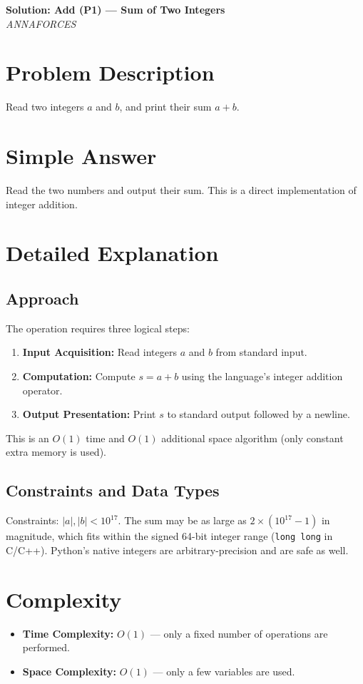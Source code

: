 \documentclass[11pt,a4paper]{article}
\begin{document}
\begin{center}
  {\LARGE \bf Solution: Add (P1) — Sum of Two Integers}\\[6pt]
  {\large \it ANNAFORCES}\
  \vspace{6pt}
\end{center}

\section*{Problem Description}
Read two integers $a$ and $b$, and print their sum $a+b$.

\section*{Simple Answer}
Read the two numbers and output their sum. This is a direct implementation of integer addition.

\section*{Detailed Explanation}
\subsection*{Approach}
The operation requires three logical steps:
\begin{enumerate}[leftmargin=*]
  \item \textbf{Input Acquisition:} Read integers $a$ and $b$ from standard input.
  \item \textbf{Computation:} Compute $s = a + b$ using the language's integer addition operator.
  \item \textbf{Output Presentation:} Print $s$ to standard output followed by a newline.
\end{enumerate}

This is an $O(1)$ time and $O(1)$ additional space algorithm (only constant extra memory is used).

\subsection*{Constraints and Data Types}
Constraints: $|a|,|b| < 10^{17}$. The sum may be as large as $2\times(10^{17}-1)$ in magnitude, which fits within the signed 64-bit integer range (\texttt{long long} in C/C++). Python's native integers are arbitrary-precision and are safe as well.

\section*{Complexity}
\begin{itemize}[leftmargin=*]
  \item \textbf{Time Complexity:} $O(1)$ — only a fixed number of operations are performed.
  \item \textbf{Space Complexity:} $O(1)$ — only a few variables are used.
\end{itemize}
\end{document}

